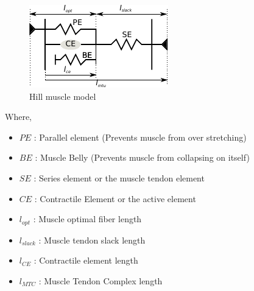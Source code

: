 \documentclass{cmc}
\begin{document}
\begin{figure}[H]
  \centering \includegraphics[scale=2.5]{figures/hill_muscle}
  \caption{Hill muscle model}
  \label{fig:hill_muscle}
\end{figure}

Where,

\begin{itemize}
\item $PE$ : Parallel element (Prevents muscle from over stretching)
\item $BE$ : Muscle Belly (Prevents muscle from collapsing on itself)
\item $SE$ : Series element or the muscle tendon element
\item $CE$ : Contractile Element or the active element
\item $l_{opt}$ : Muscle optimal fiber length
\item $l_{slack}$ : Muscle tendon slack length
\item $l_{CE}$ : Contractile element length
\item $l_{MTC}$ : Muscle Tendon Complex length
\end{itemize}
\end{document}
